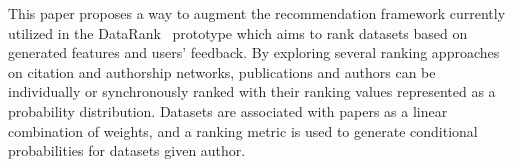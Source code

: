 This paper proposes a way to augment the recommendation framework currently utilized in the DataRank~\cite{datarank} prototype which aims to rank datasets based on generated features and users' feedback. By exploring several ranking approaches on citation and authorship networks, publications and authors can be individually or synchronously ranked with their ranking values represented as a probability distribution. Datasets are associated with papers as a linear combination of weights, and a ranking metric is used to generate conditional probabilities for datasets given author.